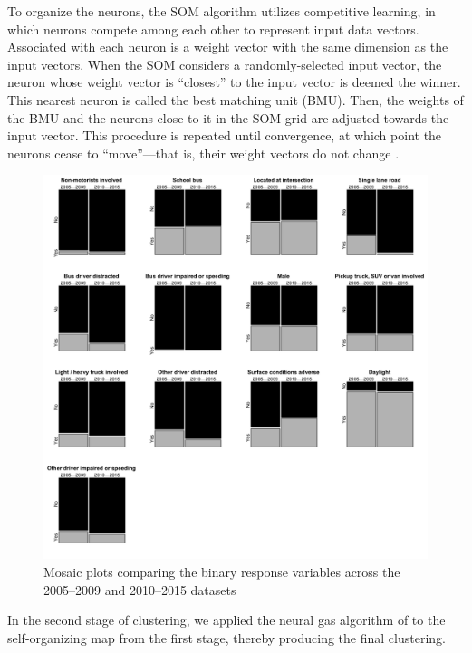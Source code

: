 To organize the neurons, the SOM algorithm utilizes competitive learning, in which neurons compete among each other to represent input data vectors. Associated with each neuron is a weight vector with the same dimension as the input vectors. When the SOM considers a randomly-selected input vector, the neuron whose weight vector is ``closest'' to the input vector is deemed the winner. This nearest neuron is called the best matching unit (BMU). Then, the weights of the BMU and the neurons close to it in the SOM grid are adjusted towards the input vector. This procedure is repeated until convergence, at which point the neurons cease to ``move''---that is, their weight vectors do not change \citep{kohonen1990}. \par
\begin{figure}[t]
        \includegraphics[width=\textwidth]{props.png}
                \caption{Mosaic plots comparing the binary response variables across the 2005--2009 
                and 2010--2015 datasets}
        \label{fig:props1}
\end{figure}
In the second stage of clustering, we applied the neural gas algorithm of \citet{martinetz1991} to the self-organizing map from the first stage, thereby producing the final clustering.
